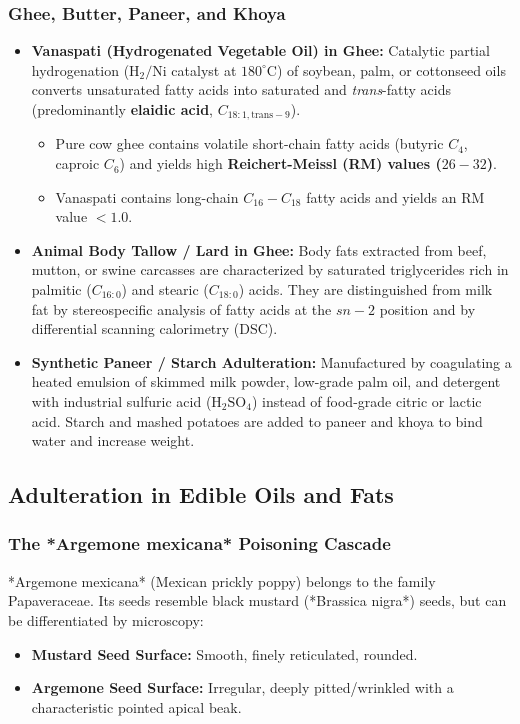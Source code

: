 \documentclass[11pt,a4paper,oneside]{article}
\begin{document}
\subsubsection{Ghee, Butter, Paneer, and Khoya}
\begin{itemize}[leftmargin=*]
    \item \textbf{Vanaspati (Hydrogenated Vegetable Oil) in Ghee:} Catalytic partial hydrogenation ($\mathrm{H_2 / Ni}$ catalyst at $180^\circ\text{C}$) of soybean, palm, or cottonseed oils converts unsaturated fatty acids into saturated and \textit{trans}-fatty acids (predominantly \textbf{elaidic acid}, $C_{18:1,\text{trans}-9}$).
    \begin{itemize}
        \item Pure cow ghee contains volatile short-chain fatty acids (butyric $C_4$, caproic $C_6$) and yields high \textbf{Reichert-Meissl (RM) values ($26-32$)}.
        \item Vanaspati contains long-chain $C_{16}-C_{18}$ fatty acids and yields an RM value $<1.0$.
    \end{itemize}
    \item \textbf{Animal Body Tallow / Lard in Ghee:} Body fats extracted from beef, mutton, or swine carcasses are characterized by saturated triglycerides rich in palmitic ($C_{16:0}$) and stearic ($C_{18:0}$) acids. They are distinguished from milk fat by stereospecific analysis of fatty acids at the $sn-2$ position and by differential scanning calorimetry (DSC).
    \item \textbf{Synthetic Paneer / Starch Adulteration:} Manufactured by coagulating a heated emulsion of skimmed milk powder, low-grade palm oil, and detergent with industrial sulfuric acid ($\mathrm{H_2SO_4}$) instead of food-grade citric or lactic acid. Starch and mashed potatoes are added to paneer and khoya to bind water and increase weight.
\end{itemize}

\subsection{Adulteration in Edible Oils and Fats}

\subsubsection{The *Argemone mexicana* Poisoning Cascade}
*Argemone mexicana* (Mexican prickly poppy) belongs to the family Papaveraceae. Its seeds resemble black mustard (*Brassica nigra*) seeds, but can be differentiated by microscopy:
\begin{itemize}
    \item \textbf{Mustard Seed Surface:} Smooth, finely reticulated, rounded.
    \item \textbf{Argemone Seed Surface:} Irregular, deeply pitted/wrinkled with a characteristic pointed apical beak.
\end{itemize}
\end{document}
